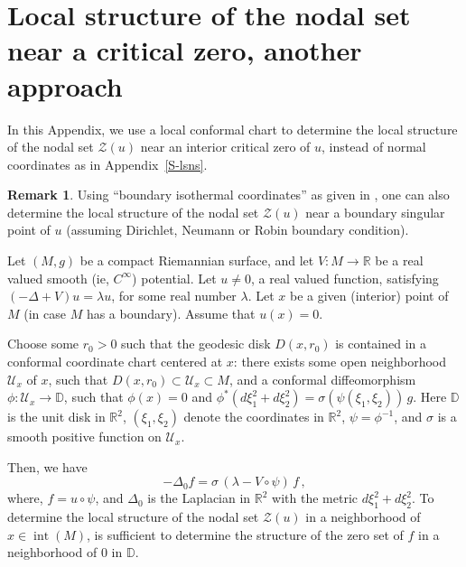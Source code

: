 \documentclass[12pt,a4paper]{amsart}
\theoremstyle{plain} %
\theoremstyle{definition}
\newtheorem{remark}[theorem]{Remark}
\numberwithin{equation}{section}
\numberwithin{figure}{section}
\numberwithin{table}{section}
\newcommand{\D}{\mathbb{D}}
\newcommand{\R}{\mathbb{R}}
\newcommand{\cU}{\mathcal{U}}
\newcommand{\cZ}{\mathcal{Z}}
\DeclareMathOperator{\inte}{int}
\begin{document}
\section{Local structure of the nodal set near a critical zero, another approach}\label{S-lsc}

In this Appendix, we use a local conformal chart to determine the local structure of the nodal set $\cZ(u)$ near an interior critical zero of $u$, instead of normal coordinates as in Appendix~\ref{S-lsns}.

\begin{remark}\label{R-Cb}
Using ``boundary isothermal coordinates'' as given in \cite[Section~2]{YaZh2021}, one can also determine the local structure of the nodal set $\cZ(u)$ near a boundary singular point of $u$ (assuming Dirichlet, Neumann or Robin boundary condition).
\end{remark}%

Let $(M,g)$ be a compact Riemannian surface, and let $V : M \to \R$ be a real valued smooth (ie, $C^\infty$) potential. Let $u \not = 0$, a real valued function, satisfying $(-\Delta + V)u = \lambda u$, for some real number $\lambda$. Let $x$ be a given (interior) point of $M$ (in case $M$ has a boundary). Assume that $u(x) = 0$.\smallskip

Choose some $r_0 > 0$ such that the geodesic disk $D(x,r_0)$ is contained in a conformal coordinate chart centered at $x$: there exists some open neighborhood $\cU_x$ of $x$, such that $D(x,r_0) \subset \cU_x \subset M$, and a conformal diffeomorphism $\phi : \cU_x \to \D$, such that $\phi(x) = 0$ and $\phi^{*}(d\xi_1^2 + d\xi_2^2) = \sigma(\psi(\xi_1,\xi_2)) \, g$. Here $\D$ is the unit disk in $\R^2$,  $(\xi_1,\xi_2)$ denote the coordinates in $\R^2$, $\psi = \phi^{-1}$, and $\sigma$ is a smooth positive function on $\cU_x$.

Then, we have
%
\begin{equation}\label{E-lsc-2}
- \Delta_0 f = \sigma \, \left( \lambda - V\circ \psi\right)\, f\,,
\end{equation}
%
where, $f = u\circ \psi$, and $\Delta_0$ is the Laplacian in $\R^2$ with the metric $d\xi_1^2 + d\xi_2^2$. To determine the local structure of the nodal set $\cZ(u)$ in a neighborhood of $x \in \inte(M)$, is sufficient to determine the structure of the zero set of $f$ in a neighborhood of $0$ in $\D$.\medskip
\end{document}
